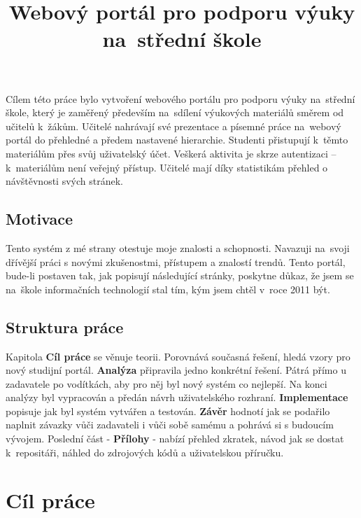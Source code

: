 \documentclass[thesis=B,czech]{FITthesis}[2012/06/26]
\title{Webový portál pro podporu výuky na~střední škole}
\begin{document}


\begin{introduction}
Cílem této práce bylo vytvoření webového portálu pro podporu výuky na~střední škole, který je zaměřený především na~sdílení výukových materiálů směrem od učitelů k~žákům. Učitelé nahrávají své prezentace a písemné práce na~webový portál do přehledné a předem nastavené hierarchie. Studenti přistupují k~těmto materiálům přes svůj uživatelský účet. Veškerá aktivita je skrze autentizaci – k~materiálům není veřejný přístup. Učitelé mají díky statistikám přehled o návštěvnosti svých stránek.

\section{Motivace} 
Tento systém z mé strany otestuje moje znalosti a schopnosti. Navazuji na~svoji dřívější práci s novými zkušenostmi, přístupem a znalostí trendů. Tento portál, bude-li postaven tak, jak popisují následující stránky, poskytne důkaz, že jsem se na~škole informačních technologií stal tím, kým jsem chtěl v~roce 2011 být.

\section{Struktura práce}
Kapitola \textbf{Cíl práce} se věnuje teorii. Porovnává současná řešení, hledá vzory pro nový studijní portál. \textbf{Analýza} připravila jedno konkrétní řešení. Pátrá přímo u zadavatele po vodítkách, aby pro něj byl nový systém co nejlepší. Na konci analýzy byl vypracován a předán návrh uživatelského rozhraní. \textbf{Implementace} popisuje jak byl systém vytvářen a testován. \textbf{Závěr} hodnotí jak se podařilo naplnit závazky vůči zadavateli i vůči sobě samému a pohrává si s budoucím vývojem. Poslední část - \textbf{Přílohy} - nabízí přehled zkratek, návod jak se dostat k~repositáři, náhled do zdrojových kódů a uživatelskou příručku.

\end{introduction}

\chapter{Cíl práce}
\end{document}
